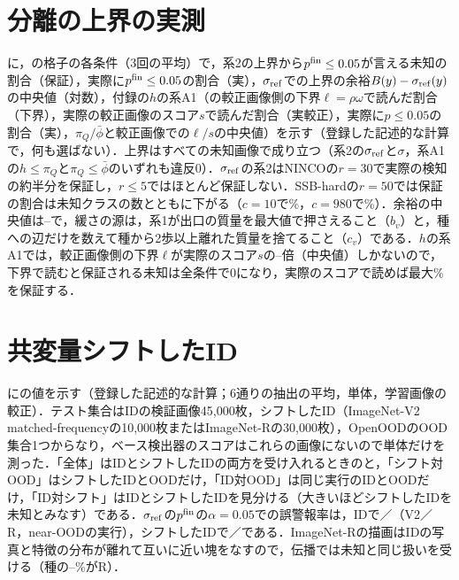 \section{分離の上界の実測}
\label{sec:app_bounds}
に，の格子の各条件（3回の平均）で，系2の上界から$\pfin\le0.05$が言える未知の割合（保証），実際に$\pfin\le0.05$の割合（実），$\sigma_{\mathrm{ref}}$での上界の余裕$B(y)-\sigma_{\mathrm{ref}}(y)$の中央値（対数），付録の$h$の系A1（\TCapture{}の較正画像側の下界$\ell=\rho\omega$で読んだ割合（下界），実際の較正画像のスコア$s$で読んだ割合（実較正），実際に$p\le0.05$の割合（実），$\pi_Q/\bar\phi$と較正画像での$\ell/s$の中央値）を示す（登録した記述的な計算で，何も選ばない）．上界はすべての未知画像で成り立つ（系2の$\sigma_{\mathrm{ref}}$と$\sigma$，系A1の$h\le\pi_Q$と$\pi_Q\le\bar\phi$のいずれも違反0）．$\sigma_{\mathrm{ref}}$の系2はNINCOの$r{=}30$で実際の検知の約半分を保証し，$r\le5$ではほとんど保証しない．SSB-hardの$r{=}50$では保証の割合は未知クラスの数とともに下がる（$c{=}10$で\NRBdRefSsbCTenRFiftyCert\%，$c{=}980$で\NRBdRefSsbCNineEightyRFiftyCert\%）．余裕の中央値は\NRBdRefSlackMin--\NRBdRefSlackMax{}で，緩さの源は，系1が出口の質量を最大値で押さえること（$b_v$）と，種への辺だけを数えて種から2歩以上離れた質量を捨てること（$c_v$）である．$h$の系A1では，較正画像側の下界$\ell$が実際のスコア$s$の\NRBdHOneEllOverSMedMin--\NRBdHOneEllOverSMedMax{}倍（中央値）しかないので，下界で読むと保証される未知は全条件で0になり，実際のスコアで読めば最大\NRBdHOneCertSMax\%を保証する．

\begin{table}[htbp]
\centering
\caption{分離の上界の実測（格子の各条件，3回の平均；[\%]，余裕と比は中央値）．保証：上界だけから$\pfin\le0.05$（$h$では$p\le0.05$）が言える未知の割合，実：実際の割合．}
\label{tab:bounds}
\vspace{1.5mm}

\end{table}

\section{共変量シフトしたID}
\label{sec:app_csid}
にの値を示す（登録した記述的な計算；6通りの抽出の平均，単体，学習画像の較正）．テスト集合はIDの検証画像45,000枚，シフトしたID（ImageNet-V2 matched-frequencyの10,000枚またはImageNet-Rの30,000枚），OpenOODのOOD集合1つからなり，ベース検出器のスコアはこれらの画像にないので単体だけを測った．「全体」はIDとシフトしたIDの両方を受け入れるときの\AUC{}と\FPR{}，「シフト対OOD」はシフトしたIDとOODだけ，「ID対OOD」は同じ実行のIDとOODだけ，「ID対シフト」はIDとシフトしたIDを見分ける\AUC{}（大きいほどシフトしたIDを未知とみなす）である．$\sigma_{\mathrm{ref}}$の$p^{\mathrm{fin}}$の$\alpha{=}0.05$での誤警報率は，IDで\NRCsVTwoNearFprIdFive{}／\NRCsRNearFprIdFive{}（V2／R，near-OODの実行），シフトしたIDで\NRCsVTwoNearFprCsFive{}／\NRCsRNearFprCsFive{}である．ImageNet-Rの描画はIDの写真と特徴の分布が離れて互いに近い塊をなすので，伝播では未知と同じ扱いを受ける（種の\NRCsRNearSeedShare--\NRCsRFarSeedShare\%がR）．

